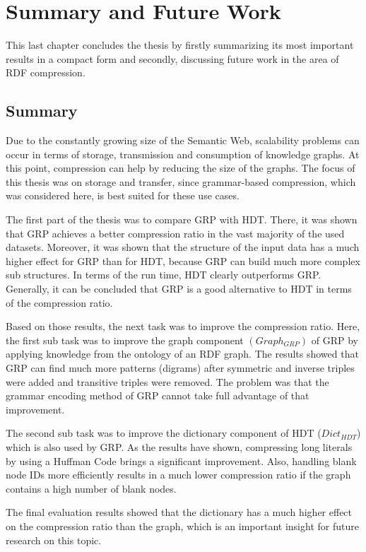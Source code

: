 \chapter{Summary and Future Work}\label{ch:summary_and_discussion}

This last chapter concludes the thesis by firstly summarizing its most important results in a compact form and secondly,  discussing  future work in the area of RDF compression.

\section{Summary}

Due to the constantly growing size of the Semantic Web, scalability problems can occur in terms of storage, transmission and consumption of knowledge graphs. At this point, compression can help by reducing the size of the graphs. The focus of this thesis was on storage and transfer, since grammar-based compression, which was considered here, is best suited for these use cases. 

The first part of the thesis was to compare GRP with HDT. There, it was shown that GRP achieves a better compression ratio in the vast majority of the used datasets. Moreover, it was shown that the structure of the input data has a much higher effect for GRP than for HDT, because GRP can build much more complex sub structures. In terms of the run time, HDT clearly outperforms GRP. Generally, it can be concluded that GRP is a good alternative to HDT in terms of the compression ratio.

Based on those results, the next task was to improve the compression ratio. Here, the first sub task was to improve the graph component $(Graph_{GRP})$ of GRP by applying knowledge from the ontology of an RDF graph. The results showed that GRP can find much more patterns (digrams) after symmetric and inverse triples were added and transitive triples were removed. The problem was that the grammar encoding method of GRP cannot take full advantage of that improvement.

The second sub task was to improve the dictionary component of HDT ($Dict_{HDT}$) which is also used by GRP. As the results have shown, compressing long literals by using a Huffman Code brings a significant improvement. Also, handling blank node IDs more efficiently results in a much lower compression ratio if the graph contains a high number of blank nodes.

The final evaluation results showed that the dictionary has a much higher effect on the compression ratio than the graph, which is an important insight for future research on this topic.


